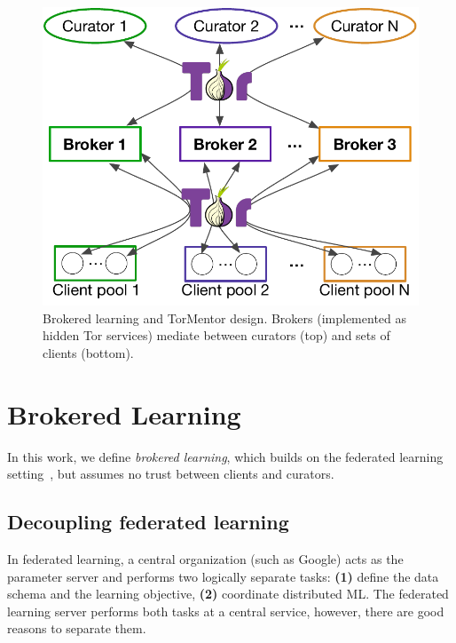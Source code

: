 
\begin{figure}[t]
  \centering
  \includegraphics[width=.9\linewidth]{fig/sys-design-multib}
  \caption{Brokered learning and TorMentor design. Brokers
    (implemented as hidden Tor services) mediate between curators
    (top) and sets of clients (bottom). }
  \label{fig:sysdiagram}
\end{figure}


\chapter{Brokered Learning}
\label{sec:setting}

In this work, we define \textit{brokered learning}, which builds on the
federated learning setting~\cite{McMahan:2017}, but assumes no trust
between clients and curators.

\section{Decoupling federated learning}

In federated learning, a central organization (such as Google) acts as
the parameter server and performs two logically separate tasks:
\textbf{(1)} define the data schema and the learning objective, 
\textbf{(2)} coordinate distributed ML. The federated learning server
performs both tasks at a central service, however, there are good
reasons to separate them.

